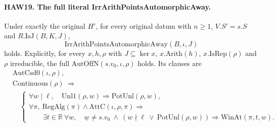 \documentclass[11pt,a4paper]{article}
\numberwithin{equation}{section}
\theoremstyle{remark}\newtheorem{remark}[theorem]{Remark}
\begin{document}
\paragraph{HAW19. The full literal IrrArithPointsAutomorphicAway.}
\label{claim:HAW19}
Under exactly the original $H'$, for every original datum
with $n\ge1$, $V.S'=s.S$ and $R.\mathrm{IsJ}(B,K,J)$,
\[
              \mathrm{IrrArithPointsAutomorphicAway}(B,\iota,J)
 \tag{HAW.30}
\]
holds.  Explicitly, for every $x,h,\rho$ with
$J\subseteq\ker x$, $x.\mathrm{Arith}(h)$,
$x.\mathrm{IsRep}(\rho)$ and $\rho$ irreducible, the full
$\mathrm{AutOffN}(s.v_0,\iota,\rho)$ holds.  Its clauses are
\[
 \begin{split}
 &\mathrm{AutCsd0}(\iota,\rho),\\
 &\mathrm{Continuous}(\rho)\ \Longrightarrow\\
 &\quad\left\{\begin{array}{l}
     \forall w\mid\ell,\quad
       \mathrm{Unl1}(\rho,w)\Longrightarrow\mathrm{PotUnl}(\rho,w),\\
     \forall\pi,\ \mathrm{RegAlg}(\pi)\land
                  \mathrm{AttC}(\iota,\rho,\pi)\Longrightarrow\\
     \qquad\exists t\in\mathbb R\ \forall w,\quad
     \underline w\ne s.v_0\ \land\
       (w\nmid\ell\ \lor\ \mathrm{PotUnl}(\rho,w))
          \Longrightarrow\mathrm{WinAt}(\pi,t,w).
   \end{array}\right.
 \end{split}
 \tag{HAW.31}
\]
\end{document}
